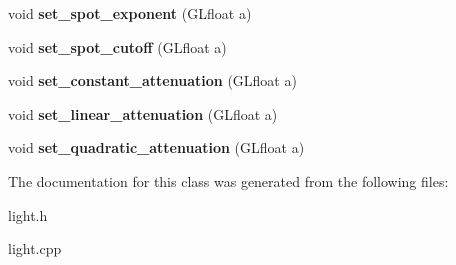 \begin{DoxyCompactItemize}
\item 
\hypertarget{class_light_ad39fda7eb76ee2f434a922a32966853e}{
void {\bfseries set\_\-spot\_\-exponent} (GLfloat a)}
\label{class_light_ad39fda7eb76ee2f434a922a32966853e}

\item 
\hypertarget{class_light_a6bb216457bc074646d6e9a635bd0e21d}{
void {\bfseries set\_\-spot\_\-cutoff} (GLfloat a)}
\label{class_light_a6bb216457bc074646d6e9a635bd0e21d}

\item 
\hypertarget{class_light_a7bcde10c010075b0ab799ee74beea408}{
void {\bfseries set\_\-constant\_\-attenuation} (GLfloat a)}
\label{class_light_a7bcde10c010075b0ab799ee74beea408}

\item 
\hypertarget{class_light_afd11fffb3efbd85268d6caaeeecb3868}{
void {\bfseries set\_\-linear\_\-attenuation} (GLfloat a)}
\label{class_light_afd11fffb3efbd85268d6caaeeecb3868}

\item 
\hypertarget{class_light_a1e9be9e89b440d03109373b0e89f109b}{
void {\bfseries set\_\-quadratic\_\-attenuation} (GLfloat a)}
\label{class_light_a1e9be9e89b440d03109373b0e89f109b}

\end{DoxyCompactItemize}


The documentation for this class was generated from the following files:\begin{DoxyCompactItemize}
\item 
light.h\item 
light.cpp\end{DoxyCompactItemize}
